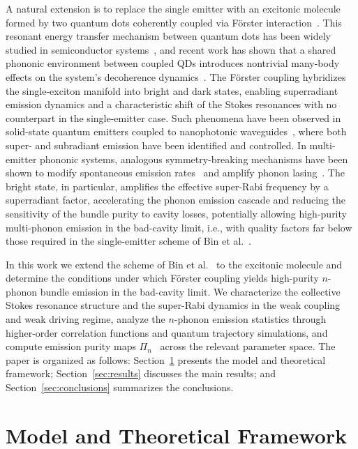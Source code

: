 \documentclass{ws-ijmpb}
\begin{document}
A natural extension is to replace the single emitter with an excitonic molecule formed by two 
quantum dots coherently coupled via F\"orster 
interaction~\cite{forster1948,kagan1996,crooker2002}. This resonant energy transfer mechanism 
between quantum dots has been widely studied in semiconductor 
systems~\cite{kagan1996,crooker2002}, and recent work has shown that a shared phononic 
environment between coupled QDs introduces nontrivial many-body effects on the system's 
decoherence dynamics~\cite{hall2025}. The F\"orster coupling hybridizes the single-exciton 
manifold into bright and dark states, enabling superradiant emission dynamics and a 
characteristic shift of the Stokes resonances with no counterpart in the single-emitter case. 
Such phenomena have been observed in solid-state quantum emitters coupled to 
nanophotonic waveguides~\cite{tiranov2023}, where both super- and subradiant emission have been 
identified and controlled. In multi-emitter phononic systems, analogous symmetry-breaking 
mechanisms have been shown to modify spontaneous emission rates~\cite{kockum2014} and amplify 
phonon lasing~\cite{kabuss2012,droenner2017}. The bright state, in particular, amplifies the 
effective super-Rabi frequency by a superradiant factor, accelerating the phonon emission 
cascade and reducing the sensitivity of the bundle purity to cavity losses, potentially 
allowing high-purity multi-phonon emission in the bad-cavity limit, i.e., with quality factors 
far below those required in the single-emitter scheme of Bin et al.~\cite{bin2020}.

In this work we extend the scheme of Bin et al.~\cite{bin2020} to the excitonic molecule and 
determine the conditions under which F\"orster coupling yields high-purity $n$-phonon bundle 
emission in the bad-cavity limit. We characterize the collective Stokes resonance structure and 
the super-Rabi dynamics in the weak coupling and weak driving regime, analyze the $n$-phonon 
emission statistics through higher-order correlation functions and quantum trajectory simulations, 
and compute emission purity maps $\Pi_n$~\cite{munoz2014,munoz2018} across the relevant 
parameter space. The paper is organized as follows: Section~\ref{sec:model} presents the model 
and theoretical framework; Section~\ref{sec:results} discusses the main results; and 
Section~\ref{sec:conclusions} summarizes the conclusions.

\section{Model and Theoretical Framework}
\label{sec:model}
\end{document}
